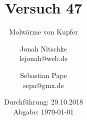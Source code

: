 

\title{Versuch 47}
\subtitle{Molwärme von Kupfer}
\author{Jonah Nitschke\\
        lejonah@web.de \and
        Sebastian Pape\\
        sepa@gmx.de}
\date{Durchführung: 29.10.2018\\
      Abgabe: \today}



\maketitle
\newpage
\setcounter{page}{1}


\newpage


\printbibliography


